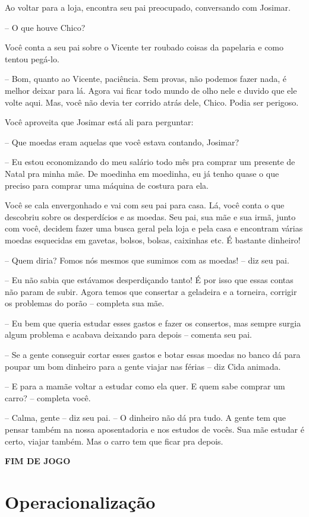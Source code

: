 Ao voltar para a loja, encontra seu pai preocupado, conversando com Josimar.

-- O que houve Chico?

Você conta a seu pai sobre o Vicente ter roubado coisas da papelaria e como tentou pegá-lo.

-- Bom, quanto ao Vicente, paciência. Sem provas, não podemos fazer nada, é melhor deixar para lá. Agora vai ficar todo mundo de olho nele e duvido que ele volte aqui. Mas, você não devia ter corrido atrás dele, Chico. Podia ser perigoso.

Você aproveita que Josimar está ali para perguntar:

-- Que moedas eram aquelas que você estava contando, Josimar?

-- Eu estou economizando do meu salário todo mês pra comprar um presente de Natal pra minha mãe. De moedinha em moedinha, eu já tenho quase o que preciso para comprar uma máquina de costura para ela.

Você se cala envergonhado e vai com seu pai para casa. Lá, você conta o que descobriu sobre os desperdícios e as moedas. Seu pai, sua mãe e sua irmã, junto com você, decidem fazer uma busca geral pela loja e pela casa e encontram várias moedas esquecidas em gavetas, bolsos, bolsas, caixinhas etc. É bastante dinheiro!

-- Quem diria? Fomos nós mesmos que sumimos com as moedas! -- diz seu pai.

-- Eu não sabia que estávamos desperdiçando tanto! É por isso que essas contas não param de subir. Agora temos que consertar a geladeira e a torneira, corrigir os problemas do porão -- completa sua mãe.

-- Eu bem que queria estudar esses gastos e fazer os consertos, mas sempre surgia algum problema e acabava deixando para depois -- comenta seu pai.

-- Se a gente conseguir cortar esses gastos e botar essas moedas no banco dá para poupar um bom dinheiro para a gente viajar nas férias -- diz Cida animada.

-- E para a mamãe voltar a estudar como ela quer. E quem sabe comprar um carro? -- completa você.

-- Calma, gente -- diz seu pai. -- O dinheiro não dá pra tudo. A gente tem que pensar também na nossa aposentadoria e nos estudos de vocês. Sua mãe estudar é certo, viajar também. Mas o carro tem que ficar pra depois.

\textbf{FIM DE JOGO}

\section{Operacionalização}

